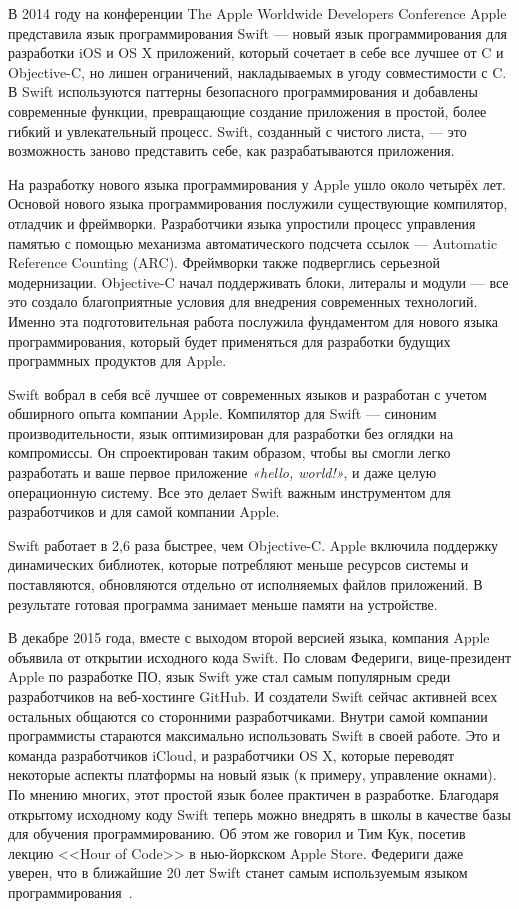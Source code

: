 
В 2014 году на конференции The Apple Worldwide Developers Conference Apple
представила язык программирования Swift --- новый язык программирования
для разработки iOS и OS X приложений, который сочетает в себе все лучшее от C и Objective-C,
но лишен ограничений, накладываемых в угоду совместимости с C.
В Swift используются паттерны безопасного программирования и добавлены
современные функции, превращающие создание приложения в простой,
более гибкий и увлекательный процесс. Swift, созданный с чистого листа, ---
это возможность заново представить себе, как разрабатываются приложения.

На разработку нового языка программирования у Apple ушло около четырёх лет.
Основой нового языка программирования послужили существующие компилятор,
отладчик и фреймворки. Разработчики языка упростили процесс управления памятью
с помощью механизма автоматического подсчета ссылок --- Automatic Reference Counting (ARC).
Фреймворки также подверглись серьезной модернизации. Objective-C начал
поддерживать блоки, литералы и модули --- все это создало благоприятные условия
для внедрения современных технологий. Именно эта подготовительная работа
послужила фундаментом для нового языка программирования,
который будет применяться для разработки будущих программных продуктов для Apple.

Swift вобрал в себя всё лучшее от современных языков и разработан с учетом
обширного опыта компании Apple. Компилятор для Swift --- синоним производительности,
язык оптимизирован для разработки без оглядки на компромиссы.
Он спроектирован таким образом, чтобы вы смогли легко разработать
и ваше первое приложение \textit{«hello, world!»}, и даже целую операционную систему.
Все это делает Swift важным инструментом для разработчиков и для самой компании Apple.

Swift работает в 2,6 раза быстрее, чем Objective-C. Apple включила поддержку
динамических библиотек, которые потребляют меньше ресурсов системы и поставляются,
обновляются отдельно от исполняемых файлов приложений.
В результате готовая программа занимает меньше памяти на устройстве.

В декабре 2015 года, вместе с выходом второй версией языка, компания Apple
объявила от открытии исходного кода Swift.
По словам Федериги, вице-президент Apple по разработке ПО, язык Swift уже
стал самым популярным среди разработчиков на веб-хостинге GitHub.
И создатели Swift сейчас активней всех остальных общаются со сторонними разработчиками.
Внутри самой компании программисты стараются максимально использовать Swift
в своей работе. Это и команда разработчиков iCloud, и разработчики OS X,
которые переводят некоторые аспекты платформы на новый язык (к примеру,
управление окнами). По мнению многих, этот простой язык более практичен в разработке.
Благодаря открытому исходному коду Swift теперь можно внедрять
в школы в качестве базы для обучения программированию. Об этом же говорил
и Тим Кук, посетив лекцию <<Hour of Code>> в нью-йоркском Apple Store.
Федериги даже уверен, что в ближайшие 20 лет Swift станет самым
используемым языком программирования~\cite{federighi_about_swift, habr_swift}.

